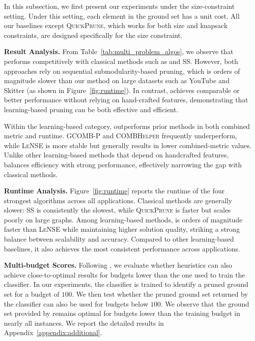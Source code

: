 In this subsection, we first present our experiments under the size-constraint setting. Under this setting, each element in the ground set has a unit cost. All our baselines except \textsc{QuickPrune}, which works for both size and knapsack constraints, are designed specifically for the size constraint.

\textbf{Result Analysis.} From Table~\ref{tab:multi_problem_algos}, we observe that \llm performs competitively with classical methods such as \qp and SS. However, both approaches rely on sequential submodularity-based pruning, which is orders of magnitude slower than our method on large datasets such as YouTube and Skitter (as shown in Figure~\ref{fig:runtime}). In contrast, \llm achieves comparable or better performance without relying on hand-crafted features, demonstrating that learning-based pruning can be both effective and efficient.



Within the learning-based category, \llm outperforms prior methods in both combined metric and runtime. GCOMB-P and \textsc{COMBHelper} frequently underperform, while \textsc{LeNSE} is more stable but generally results in lower combined-metric values. Unlike other learning-based methods that depend on handcrafted features, \llm balances efficiency with strong performance, effectively narrowing the gap with classical methods.

\textbf{Runtime Analysis.} Figure~\ref{fig:runtime} reports the runtime of the four strongest algorithms across all applications. Classical methods are generally slower: SS is consistently the slowest, while \textsc{QuickPrune} is faster but scales poorly on large graphs. Among learning-based methods, \llm is orders of magnitude faster than \textsc{LeNSE} while maintaining higher solution quality, striking a strong balance between scalability and accuracy. Compared to other learning-based baselines, it also achieves the most consistent performance across applications.

\textbf{Multi-budget Scores.} Following \cite{ireland2022lense}, we evaluate whether heuristics can also achieve close-to-optimal results for budgets lower than the one used to train the classifier. In our experiments, the classifier is trained to identify a pruned ground set for a budget of $100$. We then test whether the pruned ground set returned by the classifier can also be used for budgets below $100$. We observe that the ground set provided by \llm remains optimal for budgets lower than the training budget in nearly all instances. We report the detailed results in Appendix~\ref{appendix:additional}.

